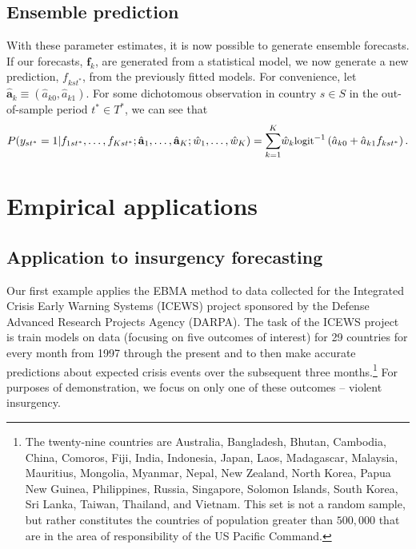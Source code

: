 \documentclass[12pt,fullpage]{article}
\newcommand{\note}[1]{\footnote{\doublespacing#1 \vspace{4 mm}}}
\begin{document}
\subsection{Ensemble prediction}

With these parameter estimates, it is now possible to generate
ensemble forecasts. If our forecasts, $\mathbf{f}_k$, are generated
from a statistical model, we now generate a new prediction,
$f_{kst^\ast}$, from the previously fitted models. For convenience,
let $\hat{\mathbf{a}}_k \equiv (\hat{a}_{k0}, \hat{a}_{k1})$. For some
dichotomous observation in country $s\in S$ in the out-of-sample
period $t^\ast\in T^\ast$, we can see that
\begin{equation}
\label{nothing}
{\small
P(y_{st^*} = 1 | f_{1st^\ast}, \ldots, f_{Kst^\ast} ;  \hat{\mathbf{a}}_1,
 \ldots, \hat{\mathbf{a}}_K ; \hat{w}_1, \ldots, \hat{w}_K) =
 \overset{K}{\underset{k=1}{\sum}} \hat{w}_k
 \mbox{logit}^{-1}\left(\hat{a}_{k0} +  \hat{a}_{k1}f_{kst^\ast}\right).}
\end{equation}


\section{Empirical applications}

\subsection{Application to insurgency forecasting}

Our first example applies the EBMA method to data
collected for the Integrated Crisis Early Warning Systems (ICEWS)
project sponsored by the Defense Advanced Research Projects Agency
(DARPA).  The task of the ICEWS project is train models on data
(focusing on five outcomes of interest) for 29 countries for every month from 1997
through the present and to then make accurate predictions about
expected crisis events over the subsequent three months.\note{The
  twenty-nine countries are Australia, Bangladesh, Bhutan, Cambodia,
  China, Comoros, Fiji, India, Indonesia, Japan, Laos, Madagascar,
  Malaysia, Mauritius, Mongolia, Myanmar, Nepal, New Zealand, North
  Korea, Papua New Guinea, Philippines, Russia, Singapore, Solomon
  Islands, South Korea, Sri Lanka, Taiwan, Thailand, and Vietnam. This
  set is not a random sample, but rather constitutes the countries of
  population greater than $500,000$ that are in the area of
  responsibility of the US Pacific Command.}  For purposes of
demonstration, we focus on only one of these outcomes -- violent
insurgency.
\end{document}
